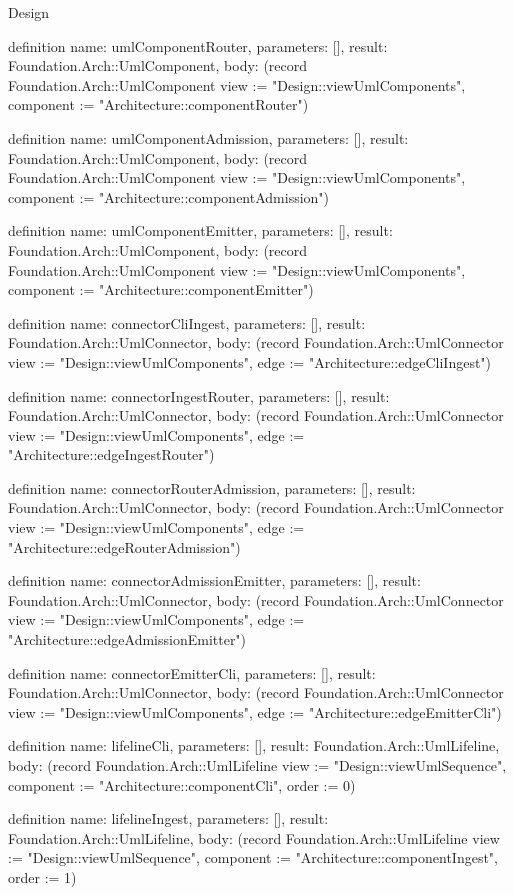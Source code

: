 \begin{lexlean}{Design}
\begin{semanticmodule}
definition{
  name: umlComponentRouter,
  parameters: [],
  result: Foundation.Arch::UmlComponent,
  body: (record Foundation.Arch::UmlComponent {view := "Design::viewUmlComponents", component := "Architecture::componentRouter"})
}

definition{
  name: umlComponentAdmission,
  parameters: [],
  result: Foundation.Arch::UmlComponent,
  body: (record Foundation.Arch::UmlComponent {view := "Design::viewUmlComponents", component := "Architecture::componentAdmission"})
}

definition{
  name: umlComponentEmitter,
  parameters: [],
  result: Foundation.Arch::UmlComponent,
  body: (record Foundation.Arch::UmlComponent {view := "Design::viewUmlComponents", component := "Architecture::componentEmitter"})
}

definition{
  name: connectorCliIngest,
  parameters: [],
  result: Foundation.Arch::UmlConnector,
  body: (record Foundation.Arch::UmlConnector {view := "Design::viewUmlComponents", edge := "Architecture::edgeCliIngest"})
}

definition{
  name: connectorIngestRouter,
  parameters: [],
  result: Foundation.Arch::UmlConnector,
  body: (record Foundation.Arch::UmlConnector {view := "Design::viewUmlComponents", edge := "Architecture::edgeIngestRouter"})
}

definition{
  name: connectorRouterAdmission,
  parameters: [],
  result: Foundation.Arch::UmlConnector,
  body: (record Foundation.Arch::UmlConnector {view := "Design::viewUmlComponents", edge := "Architecture::edgeRouterAdmission"})
}

definition{
  name: connectorAdmissionEmitter,
  parameters: [],
  result: Foundation.Arch::UmlConnector,
  body: (record Foundation.Arch::UmlConnector {view := "Design::viewUmlComponents", edge := "Architecture::edgeAdmissionEmitter"})
}

definition{
  name: connectorEmitterCli,
  parameters: [],
  result: Foundation.Arch::UmlConnector,
  body: (record Foundation.Arch::UmlConnector {view := "Design::viewUmlComponents", edge := "Architecture::edgeEmitterCli"})
}

definition{
  name: lifelineCli,
  parameters: [],
  result: Foundation.Arch::UmlLifeline,
  body: (record Foundation.Arch::UmlLifeline {view := "Design::viewUmlSequence", component := "Architecture::componentCli", order := 0})
}

definition{
  name: lifelineIngest,
  parameters: [],
  result: Foundation.Arch::UmlLifeline,
  body: (record Foundation.Arch::UmlLifeline {view := "Design::viewUmlSequence", component := "Architecture::componentIngest", order := 1})
}


\end{semanticmodule}
\end{lexlean}
